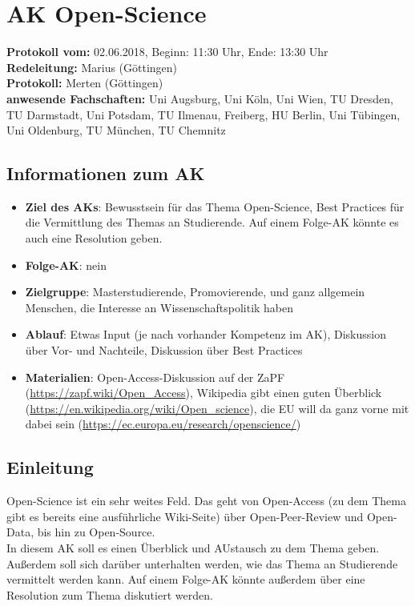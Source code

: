 
\section{AK Open-Science}

  \textbf{Protokoll vom:} 02.06.2018,
  Beginn: 11:30 Uhr,
  Ende: 13:30 Uhr \\
  \textbf{Redeleitung:} Marius (Göttingen) \\
  \textbf{Protokoll:} Merten (Göttingen) \\
  \textbf{anwesende Fachschaften:} Uni Augsburg, Uni Köln, Uni Wien, TU Dresden, TU Darmstadt, Uni Potsdam, TU Ilmenau, Freiberg, HU Berlin, Uni Tübingen, Uni Oldenburg, TU München, TU Chemnitz

  \subsection*{Informationen zum AK}
    \begin{itemize}
      \item \textbf{Ziel des AKs}: Bewusstsein für das Thema Open-Science, Best Practices für die Vermittlung des Themas an Studierende. Auf einem Folge-AK könnte es auch eine Resolution geben.
      \item \textbf{Folge-AK}: nein
      \item \textbf{Zielgruppe}: Masterstudierende, Promovierende, und ganz allgemein Menschen, die Interesse an Wissenschaftspolitik haben
      \item \textbf{Ablauf}: Etwas Input (je nach vorhander Kompetenz im AK), Diskussion über Vor- und Nachteile, Diskussion über Best Practices
      \item \textbf{Materialien}: Open-Access-Diskussion auf der ZaPF (\url{https://zapf.wiki/Open_Access}), Wikipedia gibt einen guten Überblick (\url{https://en.wikipedia.org/wiki/Open_science}), die EU will da ganz vorne mit dabei sein (\url{https://ec.europa.eu/research/openscience/})
    \end{itemize}

  \subsection*{Einleitung}
    Open-Science ist ein sehr weites Feld. Das geht von Open-Access (zu dem Thema gibt es bereits eine ausführliche Wiki-Seite) über Open-Peer-Review und Open-Data, bis hin zu Open-Source. \\
    In diesem AK soll es einen Überblick und AUstausch zu dem Thema geben. Außerdem soll sich darüber unterhalten werden, wie das Thema an Studierende vermittelt werden kann.
    Auf einem Folge-AK könnte außerdem über eine Resolution zum Thema diskutiert werden.

